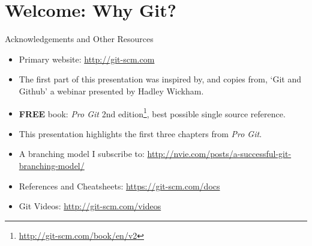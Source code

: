   \section{Welcome: Why Git?}
  \begin{frame}[t]{Acknowledgements and Other Resources}

    \begin{itemize}

      \item Primary website: \url{http://git-scm.com}

      \item The first part of this presentation was inspired by, and copies
        from, `Git and Github' a webinar presented by Hadley Wickham.

      \item {\bf FREE} book: {\it Pro Git} 2nd
        edition\footnote{\url{http://git-scm.com/book/en/v2}}, best possible
        single source reference.

      \item This presentation highlights the first three chapters from
        {\it Pro Git}.

      \item A branching model I subscribe to:
        \url{http://nvie.com/posts/a-successful-git-branching-model/}

      \item References and Cheatsheets:
        \url{https://git-scm.com/docs}

      \item Git Videos: \url{http://git-scm.com/videos}

    \end{itemize} 
  \end{frame}

